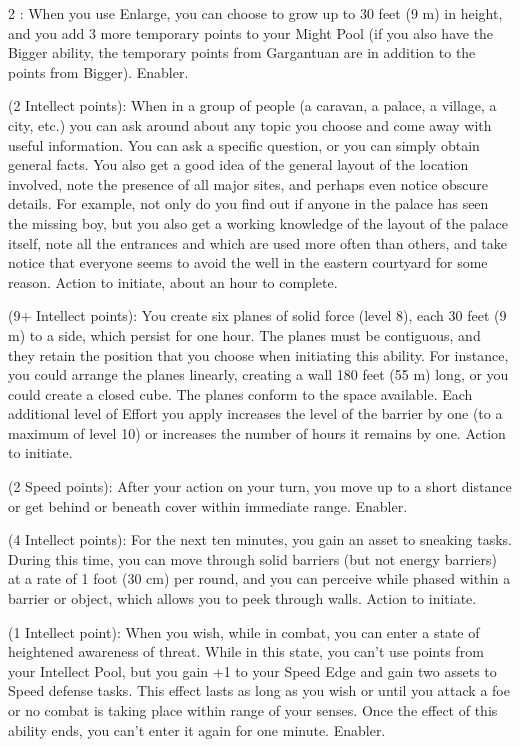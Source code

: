 \begin{multicols}{2}
: When you use Enlarge, you can choose to grow up to 30 feet (9 m) in height, and you add 3 more temporary points to your Might Pool (if you also have the Bigger ability, the temporary points from Gargantuan are in addition to the points from Bigger). Enabler. 
 
 (2 Intellect points): When in a group of people (a caravan, a palace, a village, a city, etc.) you can ask around about any topic you choose and come away with useful information. You can ask a specific question, or you can simply obtain general facts. You also get a good idea of the general layout of the location involved, note the presence of all major sites, and perhaps even notice obscure details. For example, not only do you find out if anyone in the palace has seen the missing boy, but you also get a working knowledge of the layout of the palace itself, note all the entrances and which are used more often than others, and take notice that everyone seems to avoid the well in the eastern courtyard for some reason. Action to initiate, about an hour to complete.
 
 (9+ Intellect points): You create six planes of solid force (level 8), each 30 feet (9 m) to a side, which persist for one hour. The planes must be contiguous, and they retain the position that you choose when initiating this ability. For instance, you could arrange the planes linearly, creating a wall 180 feet (55 m) long, or you could create a closed cube. The planes conform to the space available. Each additional level of Effort you apply increases the level of the barrier by one (to a maximum of level 10) or increases the number of hours it remains by one. Action to initiate. 
 
 (2 Speed points): After your action on your turn, you move up to a short distance or get behind or beneath cover within immediate range. Enabler. 
 
 (4 Intellect points): For the next ten minutes, you gain an asset to sneaking tasks. During this time, you can move through solid barriers (but not energy barriers) at a rate of 1 foot (30 cm) per round, and you can perceive while phased within a barrier or object, which allows you to peek through walls. Action to initiate. 
 
 (1 Intellect point): When you wish, while in combat, you can enter a state of heightened awareness of threat. While in this state, you can’t use points from your Intellect Pool, but you gain +1 to your Speed Edge and gain two assets to Speed defense tasks. This effect lasts as long as you wish or until you attack a foe or no combat is taking place within range of your senses. Once the effect of this ability ends, you can’t enter it again for one minute. Enabler. 
 

\end{multicols}
